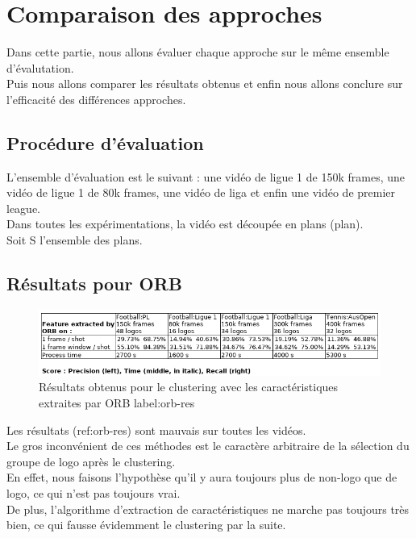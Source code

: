 \documentclass[11pt]{article}
\begin{document}
\newpage
\section{Comparaison des approches}
\label{sec:orge1617b4}
Dans cette partie, nous allons évaluer chaque approche sur le même ensemble d'évalutation.\\
Puis nous allons comparer les résultats obtenus et enfin nous allons conclure sur l'efficacité des différences approches.\\

\subsection{Procédure d'évaluation}
\label{sec:org49cb2dc}
L'ensemble d'évaluation est le suivant : une vidéo de ligue 1 de 150k frames, une vidéo de ligue 1 de 80k frames, une vidéo de liga et enfin une vidéo de premier league.\\
Dans toutes les expérimentations, la vidéo est découpée en plans (plan).\\
Soit S l'ensemble des plans.\\

\subsection{Résultats pour ORB}
\label{sec:orgdca91cc}
\begin{figure}[htbp]
\centering
\includegraphics[width=15cm]{res_orb.png}
\caption{Résultats obtenus pour le clustering avec les caractéristiques extraites par ORB label:orb-res}
\end{figure}

Les résultats (ref:orb-res) sont mauvais sur toutes les vidéos.\\
Le gros inconvénient de ces méthodes est le caractère arbitraire de la sélection du groupe de logo après le clustering.\\
En effet, nous faisons l'hypothèse qu'il y aura toujours plus de non-logo que de logo, ce qui n'est pas toujours vrai.\\
De plus, l'algorithme d'extraction de caractéristiques ne marche pas toujours très bien, ce qui fausse évidemment le clustering par la suite.\\
\end{document}
